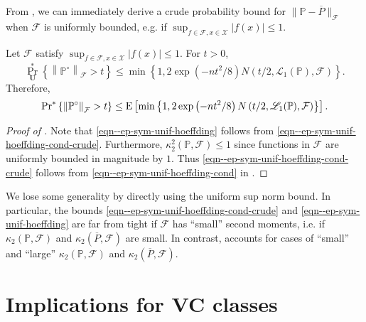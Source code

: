 From , we can immediately derive a crude
probability bound for \(\|\mathbb{P} - \overline{P} \|_{\mathcal{F}}\)
when \(\mathcal{F}\) is uniformly bounded, e.g. if \(\sup_{f \in \mathcal{F}, x
\in \mathcal{X}} |f (x)| \leq 1\).

\begin{lemma}
\label{lem--ep-sym-unif-hoeffding}
Let \(\mathcal{F}\) satisfy \(\sup_{f \in \mathcal{F}, x \in \mathcal{X}} |f
(x)| \leq 1\).
For \(t > 0\),
\begin{equation}
  \Pr_{\mathbf{U}}^{\ast} \left\{ \left\| \mathbb{P}^{\circ}
  \right\|_{\mathcal{F}} > t \right\} \leq \min \left\{ 1, 2 \exp \left( - n
  t^{2} / 8 \right) N \left( t / 2, \mathscr{L}_{1} (\mathbb{P}), \mathcal{F}
  \right) \right\}.
  \label{eqn--ep-sym-unif-hoeffding-cond-crude}
\end{equation}
Therefore,
\begin{equation}
  \mathrm{Pr}^{\ast} \left\{ \left\| \mathbb{P}^{\circ} \right\|_{\mathcal{F}} > t
  \right\} \leq \mathrm{E} \left[ \min \left\{ 1, 2 \exp \left( - n t^{2} / 8 \right) N
  \left( t / 2, \mathscr{L}_{1} (\mathbb{P}), \mathcal{F} \right) \right\}
  \right].
  \label{eqn--ep-sym-unif-hoeffding}
\end{equation}
\end{lemma}

\begin{proof}[Proof of ]
Note that \eqref{eqn--ep-sym-unif-hoeffding} follows from
\eqref{eqn--ep-sym-unif-hoeffding-cond-crude}.
Furthermore, \(\kappa_{2}^{2} (\mathbb{P}, \mathcal{F}) \leq 1\) since functions
in \(\mathcal{F}\) are uniformly bounded in magnitude by \(1\).
Thus \eqref{eqn--ep-sym-unif-hoeffding-cond-crude} follows from
\eqref{eqn--ep-sym-unif-hoeffding-cond} in
.
\end{proof}

We lose some generality by directly using the uniform sup norm bound.
In particular, the bounds \eqref{eqn--ep-sym-unif-hoeffding-cond-crude} and
\eqref{eqn--ep-sym-unif-hoeffding} are far from tight if \(\mathcal{F}\) has
``small'' second moments, i.e. if \(\kappa_{2} (\mathbb{P}, \mathcal{F})\) and
\(\kappa_{2} (\overline{P}, \mathcal{F})\) are small.
In contrast,  accounts for cases of ``small''
and ``large'' \(\kappa_{2} \left( \mathbb{P}, \mathcal{F} \right)\) and
\(\kappa_{2} \left( \overline{P}, \mathcal{F} \right)\).

\section{Implications for VC classes}

